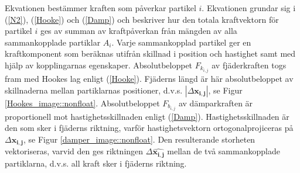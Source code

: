 \documentclass[a4paper,12pt,oneside,final,swedish]{extarticle}
\begin{document}
Ekvationen bestämmer kraften som påverkar partikel $i$. Ekvationen grundar sig i (\ref{N2}), (\ref{Hooke}) och (\ref{Damp}) och beskriver hur den totala kraftvektorn för partikel $i$ ges av summan av kraftpåverkan från mängden av alla sammankopplade partiklar $A_i$. Varje sammankopplad partikel ger en kraftkomponent som beräknas utifrån skillnad i position och hastighet samt med hjälp av kopplingarnas egenskaper. Absolutbeloppet $F_{k_{i,j}}$ av fjäderkraften togs fram med Hookes lag enligt (\ref{Hooke}). Fjäderns längd är här absolutbeloppet av skillnaderna mellan partiklarnas positioner, d.v.s. \begin{math} | \Delta \mathbf{x_{i,j}} | \end{math}, se Figur \ref{Hookes_image::nonfloat}. Absolutbeloppet $F_{b_{i,j}}$ av dämparkraften är proportionell mot hastighetsskillnaden enligt (\ref{Damp}). Hastighetsskillnaden är den som sker i fjäderns riktning, varför hastighetsvektorn ortogonalprojiceras på \begin{math} \Delta \mathbf{x_{i,j}}  \end{math}, se Figur \ref{damper_image::nonfloat}. Den resulterande storheten vektoriseras, varvid den ges riktningen \begin{math} \Delta \mathbf{\hat{x_{i,j}}}  \end{math} mellan de två sammankopplade partiklarna, d.v.s. all kraft sker i fjäderns riktning.
\end{document}
